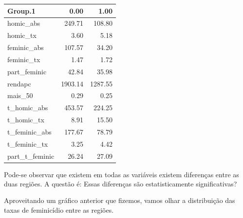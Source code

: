 \documentclass[
  letterpaper,
  DIV=11,
  numbers=noendperiod]{scrreprt}
\begin{document}
\begin{table}
\centering
\begin{tabular}[t]{l|r|r}
\hline
Group.1 & 0.00 & 1.00\\
\hline
homic\_abs & 249.71 & 108.80\\
\hline
homic\_tx & 3.60 & 5.18\\
\hline
feminic\_abs & 107.57 & 34.20\\
\hline
feminic\_tx & 1.47 & 1.72\\
\hline
part\_feminic & 42.84 & 35.98\\
\hline
rendapc & 1903.14 & 1287.55\\
\hline
mais\_50 & 0.29 & 0.25\\
\hline
t\_homic\_abs & 453.57 & 224.25\\
\hline
t\_homic\_tx & 8.91 & 15.50\\
\hline
t\_feminic\_abs & 177.67 & 78.79\\
\hline
t\_feminic\_tx & 3.25 & 4.42\\
\hline
part\_t\_feminic & 26.24 & 27.09\\
\hline
\end{tabular}
\end{table}

Pode-se observar que existem em todas as variáveis existem diferenças
entre as duas regiões. A questão é: Essas diferenças são
estatisticamente significativas?

Aproveitando um gráfico anterior que fizemos, vamos olhar a distribuição
das taxas de feminicídio entre as regiões.
\end{document}
